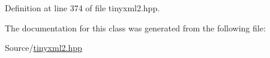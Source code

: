 Definition at line 374 of file tinyxml2.\-hpp.



The documentation for this class was generated from the following file\-:\begin{DoxyCompactItemize}
\item 
Source/\hyperlink{tinyxml2_8hpp}{tinyxml2.\-hpp}\end{DoxyCompactItemize}
